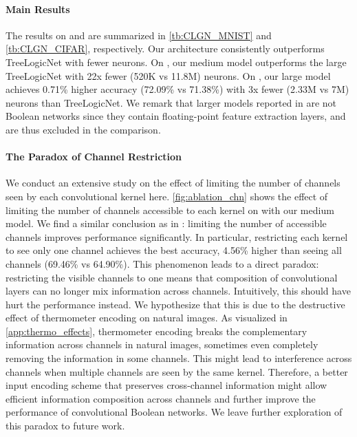 \paragraph{Main Results} The results on \mnist and \cifar are summarized in \cref{tb:CLGN_MNIST} and \cref{tb:CLGN_CIFAR}, respectively. Our architecture consistently outperforms 
TreeLogicNet with fewer neurons. On \mnist, our medium model outperforms the large TreeLogicNet with 22x fewer (520K vs 11.8M) neurons. 
On \cifar, our large model achieves 0.71\% higher accuracy (72.09\% vs 71.38\%) with 3x fewer (2.33M vs 7M) neurons than TreeLogicNet. 
We remark that larger models reported in \citet{petersen2024convolutional} are not Boolean networks since they 
contain floating-point feature extraction layers, and are thus excluded in the comparison.



\paragraph{The Paradox of Channel Restriction} We conduct an extensive study on the effect of limiting the number of channels seen by each convolutional kernel here. 
\cref{fig:ablation_chn} shows the effect of limiting the number of channels accessible to each kernel
 on \cifar with our medium model. We find a similar conclusion as in \citet{petersen2024convolutional}: limiting the number of accessible channels improves performance significantly. 
 In particular, restricting each kernel to see only one channel achieves the best accuracy, 4.56\% higher than seeing all channels (69.46\% vs 64.90\%). This phenomenon leads to a direct paradox: restricting the visible channels to one means that composition of convolutional layers 
 can no longer mix information across channels. Intuitively, this should have hurt the performance instead.
 We hypothesize that this is due to the destructive effect of thermometer encoding on natural images. As  visualized in \cref{app:thermo_effects}, thermometer encoding breaks the complementary information across channels in natural images, sometimes even completely removing the information in some channels. This might lead to interference across channels when multiple channels are seen by the same kernel. Therefore, a better input encoding scheme that preserves cross-channel information might allow efficient information composition across channels and further improve the performance of convolutional Boolean networks. We leave further exploration of this paradox to future work.


